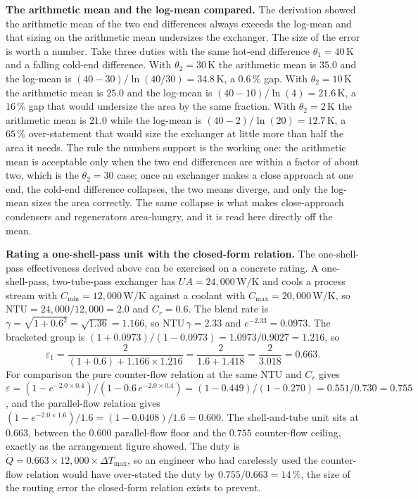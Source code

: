 \textbf{The arithmetic mean and the log-mean compared.} The derivation showed the
arithmetic mean of the two end differences always exceeds the log-mean and that
sizing on the arithmetic mean undersizes the exchanger. The size of the error is
worth a number. Take three duties with the same hot-end difference $\theta_1 =
40\,\si{\kelvin}$ and a falling cold-end difference. With $\theta_2 = 30\,
\si{\kelvin}$ the arithmetic mean is $35.0$ and the log-mean is $(40 - 30)/\ln(40/
30) = 34.8\,\si{\kelvin}$, a $0.6\,\%$ gap. With $\theta_2 = 10\,\si{\kelvin}$ the
arithmetic mean is $25.0$ and the log-mean is $(40 - 10)/\ln(4) = 21.6\,\si{
\kelvin}$, a $16\,\%$ gap that would undersize the area by the same fraction. With
$\theta_2 = 2\,\si{\kelvin}$ the arithmetic mean is $21.0$ while the log-mean is
$(40 - 2)/\ln(20) = 12.7\,\si{\kelvin}$, a $65\,\%$ over-statement that would size
the exchanger at little more than half the area it needs. The rule the numbers
support is the working one: the arithmetic mean is acceptable only when the two end
differences are within a factor of about two, which is the $\theta_2 = 30$ case;
once an exchanger makes a close approach at one end, the cold-end difference
collapses, the two means diverge, and only the log-mean sizes the area correctly.
The same collapse is what makes close-approach condensers and regenerators
area-hungry, and it is read here directly off the mean.

\textbf{Rating a one-shell-pass unit with the closed-form relation.} The
one-shell-pass effectiveness derived above can be exercised on a concrete rating.
A one-shell-pass, two-tube-pass exchanger has $UA = 24{,}000\,\text{W}/\si{
\kelvin}$ and cools a process stream with $C_{\min} = 12{,}000\,\si{\watt\per
\kelvin}$ against a coolant with $C_{\max} = 20{,}000\,\si{\watt\per\kelvin}$, so
$\text{NTU} = 24{,}000/12{,}000 = 2.0$ and $C_r = 0.6$. The blend rate is $\gamma =
\sqrt{1 + 0.6^2} = \sqrt{1.36} = 1.166$, so $\text{NTU}\,\gamma = 2.33$ and
$e^{-2.33} = 0.0973$. The bracketed group is $(1 + 0.0973)/(1 - 0.0973) = 1.0973/
0.9027 = 1.216$, so
\[
\varepsilon_1 = \frac{2}{(1 + 0.6) + 1.166\times 1.216}
= \frac{2}{1.6 + 1.418} = \frac{2}{3.018} = 0.663.
\]
For comparison the pure counter-flow relation at the same NTU and $C_r$ gives
$\varepsilon = (1 - e^{-2.0\times 0.4})/(1 - 0.6\,e^{-2.0\times 0.4}) = (1 -
0.449)/(1 - 0.270) = 0.551/0.730 = 0.755$, and the parallel-flow relation gives
$(1 - e^{-2.0\times 1.6})/1.6 = (1 - 0.0408)/1.6 = 0.600$. The shell-and-tube unit
sits at $0.663$, between the $0.600$ parallel-flow floor and the $0.755$
counter-flow ceiling, exactly as the arrangement figure showed. The duty is
$\dot{Q} = 0.663\times 12{,}000\times \Delta T_{\max}$, so an engineer who had
carelessly used the counter-flow relation would have over-stated the duty by
$0.755/0.663 = 14\,\%$, the size of the routing error the closed-form relation
exists to prevent.

